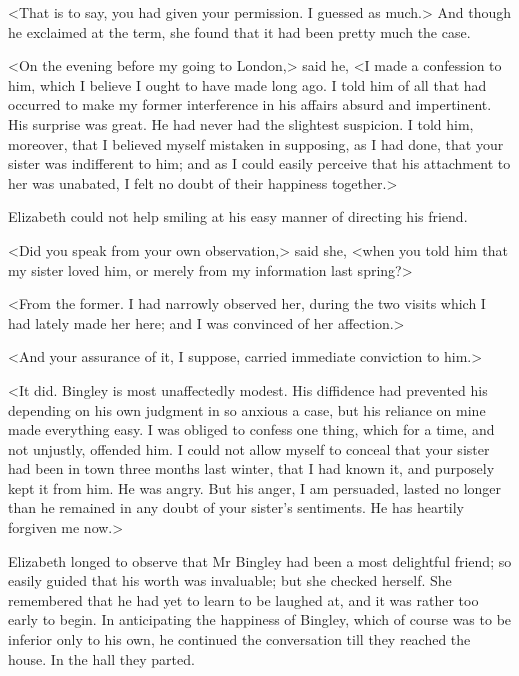 <That is to say, you had given your permission. I guessed as much.> And though he exclaimed at the term, she found that it had been pretty much the case.

<On the evening before my going to London,> said he, <I made a confession to him, which I believe I ought to have made long ago. I told him of all that had occurred to make my former interference in his affairs absurd and impertinent. His surprise was great. He had never had the slightest suspicion. I told him, moreover, that I believed myself mistaken in supposing, as I had done, that your sister was indifferent to him; and as I could easily perceive that his attachment to her was unabated, I felt no doubt of their happiness together.>

Elizabeth could not help smiling at his easy manner of directing his friend.

<Did you speak from your own observation,> said she, <when you told him that my sister loved him, or merely from my information last spring?>

<From the former. I had narrowly observed her, during the two visits which I had lately made her here; and I was convinced of her affection.>

<And your assurance of it, I suppose, carried immediate conviction to him.>

<It did. Bingley is most unaffectedly modest. His diffidence had prevented his depending on his own judgment in so anxious a case, but his reliance on mine made everything easy. I was obliged to confess one thing, which for a time, and not unjustly, offended him. I could not allow myself to conceal that your sister had been in town three months last winter, that I had known it, and purposely kept it from him. He was angry. But his anger, I am persuaded, lasted no longer than he remained in any doubt of your sister's sentiments. He has heartily forgiven me now.>

Elizabeth longed to observe that Mr Bingley had been a most delightful friend; so easily guided that his worth was invaluable; but she checked herself. She remembered that he had yet to learn to be laughed at, and it was rather too early to begin. In anticipating the happiness of Bingley, which of course was to be inferior only to his own, he continued the conversation till they reached the house. In the hall they parted.